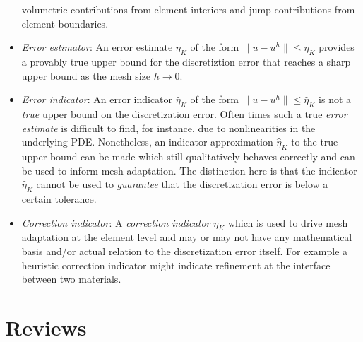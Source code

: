 \documentclass{article}
\begin{document}
\begin{itemize}
volumetric contributions from element interiors and jump contributions from
element boundaries.
\item \emph{Error estimator}: An error estimate $\eta_K$ of the form
$\| u - u^h \| \leq \eta_K$ provides a provably true upper bound for the
discretiztion error that reaches a sharp upper bound as the mesh size
$h \to 0$.
\item \emph{Error indicator}: An error indicator $\hat{\eta}_K$ of the
form $\| u - u^h \| \leq \hat{\eta}_K$ is not a \emph{true} upper bound
on the discretization error. Often times such a true \emph{error estimate}
is difficult to find, for instance, due to nonlinearities in the
underlying PDE. Nonetheless, an indicator approximation $\hat{\eta}_K$
to the true upper bound can be made which still qualitatively behaves
correctly and can be used to inform mesh adaptation. The distinction here
is that the indicator $\hat{\eta}_K$ cannot be used to \emph{guarantee}
that the discretization error is below a certain tolerance.
\item \emph{Correction indicator}: A  \emph{correction indicator}
$\tilde{\eta}_K$ which is used to drive mesh adaptation at the element
level and may or may not have any mathematical basis and/or actual relation
to the discretization error itself. For example a heuristic correction
indicator might indicate refinement at the interface between two materials.
\end{itemize}

\section{Reviews}
\end{document}

